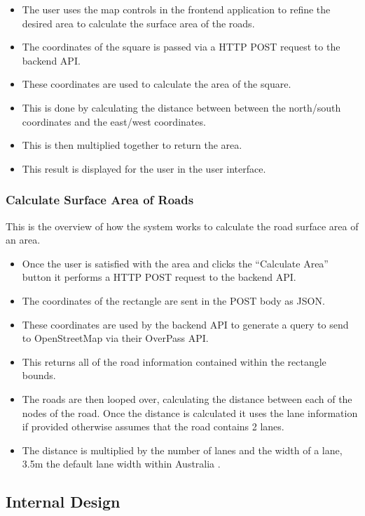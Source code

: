 \documentclass[a4paper,11pt]{article}
\begin{document}
\begin{itemize}
  \item The user uses the map controls in the frontend application to refine
    the desired area to calculate the surface area of the roads.
  \item The coordinates of the square is passed via a HTTP POST request to
    the backend API.\@
  \item These coordinates are used to calculate the area of the square.
  \item This is done by calculating the distance between between the
    north/south coordinates and the east/west coordinates.
  \item This is then multiplied together to return the area.
  \item This result is displayed for the user in the user interface.
\end{itemize}

\subsubsection{Calculate Surface Area of Roads}

This is the overview of how the system works to calculate the road surface area
of an area.

\begin{itemize}
  \item Once the user is satisfied with the area and clicks the ``Calculate
    Area'' button it performs a HTTP POST request to the backend API.\@
  \item The coordinates of the rectangle are sent in the POST body as JSON.\@
  \item These coordinates are used by the backend API to generate a query to
    send to OpenStreetMap via their OverPass API.\@
  \item This returns all of the road information contained within the rectangle
    bounds.
  \item The roads are then looped over, calculating the distance between each of
    the nodes of the road. Once the distance is calculated it uses the lane
    information if provided otherwise assumes that the road contains 2 lanes.
  \item The distance is multiplied by the number of lanes and the width of a
    lane, 3.5m the default lane width within Australia \autocite{lane:11}.
\end{itemize}

\subsection{Internal Design}
\end{document}
